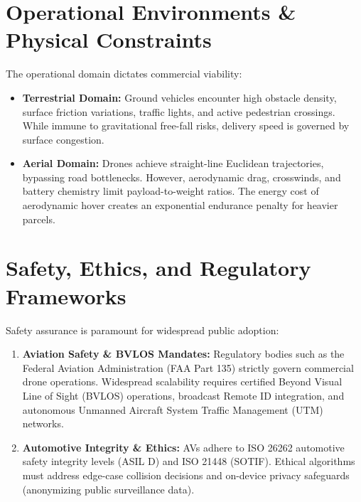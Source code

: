 \documentclass[conference,10pt]{IEEEtran}
\begin{document}
\section{Operational Environments \& Physical Constraints}
The operational domain dictates commercial viability:
\begin{itemize}
    \item \textbf{Terrestrial Domain:} Ground vehicles encounter high obstacle density, surface friction variations, traffic lights, and active pedestrian crossings. While immune to gravitational free-fall risks, delivery speed is governed by surface congestion.
    \item \textbf{Aerial Domain:} Drones achieve straight-line Euclidean trajectories, bypassing road bottlenecks. However, aerodynamic drag, crosswinds, and battery chemistry limit payload-to-weight ratios. The energy cost of aerodynamic hover creates an exponential endurance penalty for heavier parcels.
\end{itemize}

\section{Safety, Ethics, and Regulatory Frameworks}
Safety assurance is paramount for widespread public adoption:
\begin{enumerate}
    \item \textbf{Aviation Safety \& BVLOS Mandates:} Regulatory bodies such as the Federal Aviation Administration (FAA Part 135) strictly govern commercial drone operations. Widespread scalability requires certified Beyond Visual Line of Sight (BVLOS) operations, broadcast Remote ID integration, and autonomous Unmanned Aircraft System Traffic Management (UTM) networks.
    \item \textbf{Automotive Integrity \& Ethics:} AVs adhere to ISO 26262 automotive safety integrity levels (ASIL D) and ISO 21448 (SOTIF). Ethical algorithms must address edge-case collision decisions and on-device privacy safeguards (anonymizing public surveillance data).
\end{enumerate}
\end{document}
